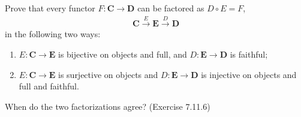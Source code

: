 Prove that every functor $F: \textbf{C} \to \textbf{D}$ can be factored as $D \circ E = F$,
\begin{gather*}
    \textbf{C} \overset{E}{\longrightarrow} \textbf{E} \overset{D}{\longrightarrow} \textbf{D}
\end{gather*}
in the following two ways:
\begin{enumerate}[label=(\alph*)]
    \item $E: \textbf{C} \to \textbf{E}$ is bijective on objects and full, and $D: \textbf{E} \to \textbf{D}$ is faithful;
    \item $E: \textbf{C} \to \textbf{E}$ is surjective on objects and $D: \textbf{E} \to \textbf{D}$ is injective on objects and full and faithful.
\end{enumerate}
When do the two factorizations agree? (Exercise 7.11.6)
